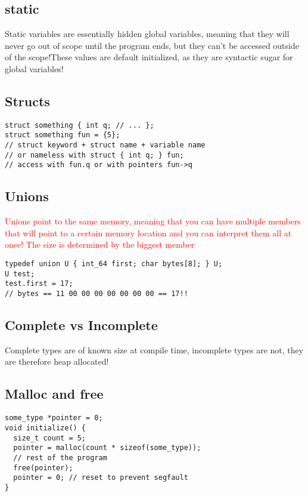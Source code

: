 \documentclass[main.tex,fontsize=8pt,paper=a4,paper=landscape,DIV=calc,]{scrartcl}
\begin{document}
\begin{multicols*}{4}
\subsection{static}
Static variables are essentially hidden global variables, meaning that they will never go out of scope until the program ends, but they can't be accessed outside of the scope!These values are default initialized, as they are syntactic sugar for global variables!

\subsection{Structs}
\vspace{-2.5mm}
\begin{lstlisting}
struct something { int q; // ... };
struct something fun = {5};
// struct keyword + struct name + variable name
// or nameless with struct { int q; } fun;
// access with fun.q or with pointers fun->q
\end{lstlisting}
\vspace{2mm}

\subsection{Unions}
\textcolor{red}{Unions point to the same memory, meaning that you can have multiple members that will point to a certain memory location and you can interpret them all at once! The size is determined by the biggest member}
\vspace{-2.5mm}
\begin{lstlisting}
typedef union U { int_64 first; char bytes[8]; } U;
U test;
test.first = 17;
// bytes == 11 00 00 00 00 00 00 00 == 17!!
\end{lstlisting}
\vspace{2mm}

\subsection{Complete vs Incomplete}
Complete types are of known size at compile time, incomplete types are not, they are therefore heap allocated!

\subsection{Malloc and free}
\vspace{-2.5mm}
\begin{lstlisting}
some_type *pointer = 0;
void initialize() {
  size_t count = 5;
  pointer = malloc(count * sizeof(some_type));
  // rest of the program 
  free(pointer);
  pointer = 0; // reset to prevent segfault
}
\end{lstlisting}
\vspace{2mm}


\end{multicols*}
\end{document}
